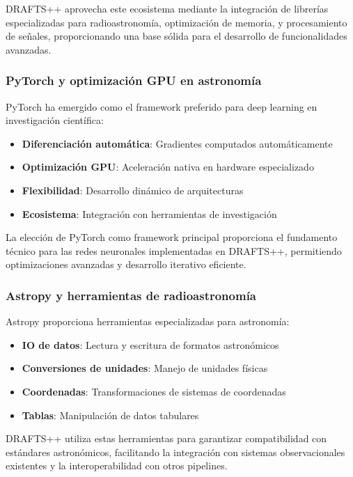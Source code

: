 DRAFTS++ aprovecha este ecosistema mediante la integración de librerías especializadas para radioastronomía, optimización de memoria, y procesamiento de señales, proporcionando una base sólida para el desarrollo de funcionalidades avanzadas.

\subsubsection{PyTorch y optimización GPU en astronomía}

PyTorch ha emergido como el framework preferido para deep learning en investigación científica:

\begin{itemize}
    \item \textbf{Diferenciación automática}: Gradientes computados automáticamente
    \item \textbf{Optimización GPU}: Aceleración nativa en hardware especializado
    \item \textbf{Flexibilidad}: Desarrollo dinámico de arquitecturas
    \item \textbf{Ecosistema}: Integración con herramientas de investigación
\end{itemize}

La elección de PyTorch como framework principal proporciona el fundamento técnico para las redes neuronales implementadas en DRAFTS++, permitiendo optimizaciones avanzadas y desarrollo iterativo eficiente.

\subsubsection{Astropy y herramientas de radioastronomía}

Astropy proporciona herramientas especializadas para astronomía:

\begin{itemize}
    \item \textbf{IO de datos}: Lectura y escritura de formatos astronómicos
    \item \textbf{Conversiones de unidades}: Manejo de unidades físicas
    \item \textbf{Coordenadas}: Transformaciones de sistemas de coordenadas
    \item \textbf{Tablas}: Manipulación de datos tabulares
\end{itemize}

DRAFTS++ utiliza estas herramientas para garantizar compatibilidad con estándares astronómicos, facilitando la integración con sistemas observacionales existentes y la interoperabilidad con otros pipelines.

